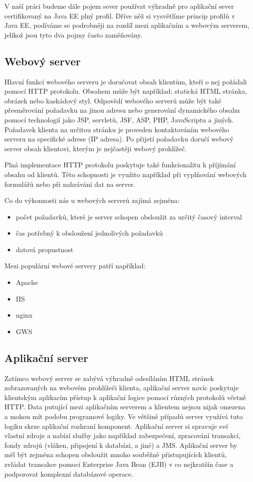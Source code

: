 \documentclass[122pt,oneside]{fithesis}
\begin{document}
V naší práci budeme dále pojem sever používat výhradně pro aplikační sever certifikovaný na Java EE plný profil. Dříve něž si vysvětlíme princip profilů v Java EE, podíváme se podrobněji na rozdíl mezi aplikačním a webovým serverem, jelikož jsou tyto dva pojmy často zaměňovány.

\subsection{Webový server}
Hlavní funkcí webového serveru je doručovat obsah klientům, kteří o nej požádali pomocí HTTP protokolu. Obsahem může být například: statická HTML stránka, obrázek nebo kaskádový styl. Odpovědí webového serverů může být také přesměrování požadavku na jinou adresu nebo generování dynamického obsahu pomocí technologií jako JSP, servletů, JSF, ASP, PHP, JavaScriptu a jiných. Požadavek klienta na určitou stránku je proveden kontaktováním webového serveru na specifické adrese (IP adresa). Po přijetí požadavku doručí webový server obsah klientovi, kterým je nejčastěji webový prohlížeč.

Plná implementace HTTP protokolu poskytuje také funkcionalitu k příjímání obsahu od klientů. Této schopnosti je využito například při vyplňování webových formulářů nebo při nahrávání dat na server.

Co do výkonnosti nás u webových serverů zajímá zejména:
\begin{itemize}
  \item počet požadavků, které je server schopen obsloužit za určitý časový interval
  \item čas potřebný k obsloužení jednolivých požadavků
  \item datová propustnost
\end{itemize}
Mezi populární webové servery patří například:
\begin{itemize}
  \item Apache
  \item IIS
  \item nginx
  \item GWS
\end{itemize}

\subsection{Aplikační server}
Zatímco webový server se zabývá výhradně odesíláním HTML stránek zobrazovaných na webovém prohlížeči klienta, aplikační server navíc poskytuje klientským aplikacím přístup k aplikační logice pomocí různých protokolů včetně HTTP. Data putující mezi aplikačním serverem a klientem nejsou nijak omezena a mohou mít podobu programové logiky. Ve většině případů server využívá tuto logiku skrze aplikační rozhraní komponent.
Aplikační server si spravuje své vlastní zdroje a nabízí služby jako například zabezpečení, zpracování transakcí, fondy zdrojů (vláken, připojení k databázi, a jiné) a JMS. Aplikační server by měl být zejména schopen obsloužit mnoho souběžně přistupujících klientů, zvládat transakce pomocí Enterprise Java Bean (EJB) v co nejkratšín čase a podporovat komplexní databázové operace.
\end{document}
